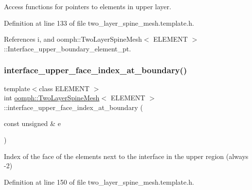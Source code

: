 Access functions for pointers to elements in upper layer. 



Definition at line 133 of file two\+\_\+layer\+\_\+spine\+\_\+mesh.\+template.\+h.



References i, and oomph\+::\+Two\+Layer\+Spine\+Mesh$<$ E\+L\+E\+M\+E\+N\+T $>$\+::\+Interface\+\_\+upper\+\_\+boundary\+\_\+element\+\_\+pt.

\mbox{\label{classoomph_1_1TwoLayerSpineMesh_a2f31c7c1ad05803e296545a0a4210164}} 
\subsubsection{\texorpdfstring{interface\+\_\+upper\+\_\+face\+\_\+index\+\_\+at\+\_\+boundary()}{interface\_upper\_face\_index\_at\_boundary()}}
{\footnotesize\ttfamily template$<$class E\+L\+E\+M\+E\+NT $>$ \\
int \hyperlink{classoomph_1_1TwoLayerSpineMesh}{oomph\+::\+Two\+Layer\+Spine\+Mesh}$<$ E\+L\+E\+M\+E\+NT $>$\+::interface\+\_\+upper\+\_\+face\+\_\+index\+\_\+at\+\_\+boundary (\begin{DoxyParamCaption}\item[{const unsigned \&}]{e }\end{DoxyParamCaption})\hspace{0.3cm}{\ttfamily [inline]}}



Index of the face of the elements next to the interface in the upper region (always -\/2) 



Definition at line 150 of file two\+\_\+layer\+\_\+spine\+\_\+mesh.\+template.\+h.

\mbox{\label{classoomph_1_1TwoLayerSpineMesh_a37e08f5f396767bdad632d9b8022655a}} 
